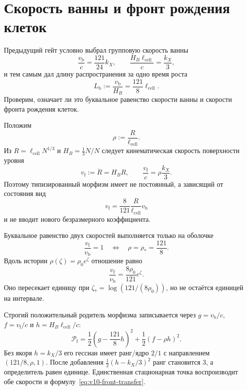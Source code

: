 \chapter{Скорость ванны и фронт рождения клеток}
\label{ch:v10-bath-group-velocity-cell-birth-front}

Предыдущий гейт условно выбрал групповую скорость ванны
\begin{equation}
 \frac{v_{\mathrm b}}{c}=\frac{121}{24}k_X,
 \qquad
 \frac{H_B\ell_{\mathrm{cell}}}{c}=\frac{k_X}{3},
\end{equation}
и тем самым дал длину распространения за одно время роста
\begin{equation}
 L_{\mathrm b}:=\frac{v_{\mathrm b}}{H_B}
 =\frac{121}{8}\ell_{\mathrm{cell}}.
\end{equation}
Проверим, означает ли это буквальное равенство скорости ванны и скорости
фронта рождения клеток.

Положим
\begin{equation}
 \rho:=\frac{R}{\ell_{\mathrm{cell}}}.
\end{equation}
Из $R=\ell_{\mathrm{cell}}N^{1/3}$ и
$H_B=\frac13\dot N/N$ следует кинематическая скорость поверхности уровня
\begin{equation}
 v_{\mathrm f}:=\dot R=H_BR,
 \qquad
 \frac{v_{\mathrm f}}{c}=\rho\frac{k_X}{3}.
\end{equation}
Поэтому типизированный морфизм имеет не постоянный, а зависящий от состояния
вид
\begin{equation}
 \boxed{
 v_{\mathrm f}=\frac{8}{121}\frac{R}{\ell_{\mathrm{cell}}}
 v_{\mathrm b}}
 \label{eq:v10-front-transfer}
\end{equation}
и не вводит нового безразмерного коэффициента.

Буквальное равенство двух скоростей выполняется только на оболочке
\begin{equation}
 \frac{v_{\mathrm f}}{v_{\mathrm b}}=1
 \quad\Longleftrightarrow\quad
 \rho=\rho_*=\frac{121}{8}.
\end{equation}
Вдоль истории $\rho(\zeta)=\rho_0e^\zeta$ отношение равно
\begin{equation}
 \frac{v_{\mathrm f}}{v_{\mathrm b}}
 =\frac{8\rho_0}{121}e^\zeta.
\end{equation}
Оно пересекает единицу при
$\zeta_*=\log(121/(8\rho_0))$, но не остаётся единицей на интервале.

Строгий положительный родитель морфизма записывается через
$g=v_{\mathrm b}/c$, $f=v_{\mathrm f}/c$ и
$h=H_B\ell_{\mathrm{cell}}/c$:
\begin{equation}
 \mathcal P_{\mathrm f}
 =\frac12\left(g-\frac{121}{8}h\right)^2
 +\frac12(f-\rho h)^2.
\end{equation}
Без якоря $h=k_X/3$ его гессиан имеет ранг/ядро $2/1$ с направлением
$(121/8,\rho,1)$. После добавления
$\frac12(h-k_X/3)^2$ ранг становится $3$, а определитель равен единице.
Единственная стационарная точка воспроизводит обе скорости и
формулу~\eqref{eq:v10-front-transfer}.

